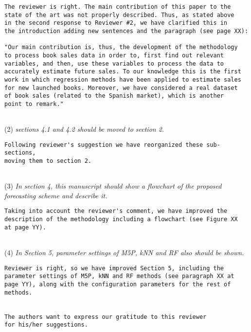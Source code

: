 \documentclass[preprint]{elsarticle}
\begin{document}
\begin{verbatim}
The reviewer is right. The main contribution of this paper to the 
state of the art was not properly described. Thus, as stated above 
in the second response to Reviewer #2, we have clarified this in 
the introduction adding new sentences and the paragraph (see page XX):

"Our main contribution is, thus, the development of the methodology 
to process book sales data in order to, first find out relevant 
variables, and then, use these variables to process the data to 
accurately estimate future sales. To our knowledge this is the first 
work in which regression methods have been applied to estimate sales 
for new launched books. Moreover, we have considered a real dataset 
of book sales (related to the Spanish market), which is another 
point to remark."

\end{verbatim}


~\\
\noindent (2) \emph{sections 4.1 and 4.2 should be moved to section 2. } 

\begin{verbatim}
Following reviewer's suggestion we have reorganized these sub-sections, 
moving them to section 2.
\end{verbatim}

~\\
\noindent (3) \emph{In section 4, this manuscript should show a flowchart of the proposed forecasting scheme and describe it. } 

\begin{verbatim}
Taking into account the reviewer's comment, we have improved the 
description of the methodology including a flowchart (see Figure XX 
at page YY).
\end{verbatim}


~\\
\noindent (4) \emph{In Section 5, parameter settings of 
M5P, kNN and RF also should be shown. } 

\begin{verbatim}
Reviewer is right, so we have improved Section 5, including the 
parameter settings of M5P, kNN and RF methods (see paragraph XX at 
page YY), along with the configuration parameters for the rest of 
methods.


The authors want to express our gratitude to this reviewer 
for his/her suggestions.
\end{verbatim}
\end{document}
